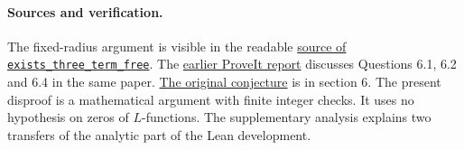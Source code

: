 \documentclass[11pt]{article}
\begin{document}
\paragraph{Sources and verification.}
The fixed-radius argument is visible in the readable
\href{https://github.com/lsernau/grh-lean/blob/72fead102f663d5c7a407964a13dc0cf9d977207/grh/src/New/Reduction/Data/Existence.lean\#L80-L116}{source of \texttt{exists\_three\_term\_free}}. The
\href{https://github.com/VladimirReshetnikov/ProveIt/blob/d31039a48d963692e5a5176f47b6603fc9e9d9cf/docs/incoming/grh-progression-densities-and-cubic-prime-race.zip}{earlier ProveIt report} discusses Questions 6.1, 6.2 and 6.4 in the same paper.
\href{https://arxiv.org/pdf/1512.01932}{The original conjecture} is in section 6.
The present disproof is a mathematical argument with finite integer checks. It uses no hypothesis on zeros of $L$-functions. The supplementary analysis explains two transfers of the analytic part of the Lean development.
\end{document}
